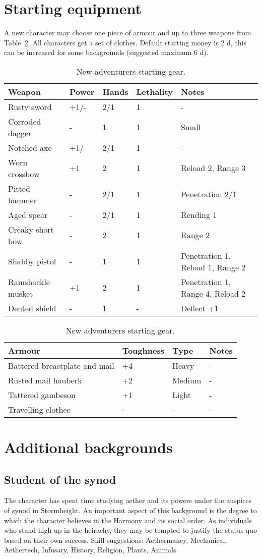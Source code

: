 \documentclass[a4paper,11pt,oneside]{book}
\begin{document}
\section{Starting equipment}
A new character may choose one piece of armour and up to three weapons from Table~\ref{tab:start-gear}. All characters get a set of clothes. Default starting money is 2 d, this can be increased for some backgrounds (suggested maximum 6 d).
\begin{table}[ht!]
	\centering
	\caption{New adventurers starting gear.}
	\label{tab:start-gear}
	\begin{tabular}{|l|l|l|l|l|}
		\hline
		Weapon & Power & Hands & Lethality & Notes\\
		\hline
		Rusty sword & +1/- & 2/1 & 1 & -\\
		Corroded dagger & - & 1 & 1 & Small\\
		Notched axe & +1/- & 2/1 & 1 & -\\
		Worn crossbow & +1 & 2 & 1 & Reload 2, Range 3\\
		Pitted hammer & - & 2/1 & 1 & Penetration 2/1 \\
		Aged spear & - & 2/1 & 1 & Rending 1\\
		Creaky short bow & - & 2 & 1 & Range 2\\
		Shabby pistol & - & 1 & 1 & Penetration 1, Reload 1, Range 2 \\
		Ramshackle musket & +1 & 2 & 1 & Penetration 1, Range 4, Reload 2 \\
		Dented shield & - & 1 & - & Deflect +1 \\
		\hline
	\end{tabular}
	\begin{tabular}{|l|l|l|l|}	
		\hline
		Armour & Toughness & Type & Notes\\
		\hline
		Battered breastplate and mail & +4 & Heavy & - \\
		Rusted mail hauberk & +2 & Medium & - \\
		Tattered gambeson & +1 & Light & - \\
		Travelling clothes & - & - & - \\
		\hline
	\end{tabular}
\end{table}


\section{Additional backgrounds}

\subsection{Student of the synod}
The character has spent time studying aether and its powers under the auspices of synod in Stormheight. An important aspect of this background is the degree to which the character believes in the Harmony and its social order. As individuals who stand high up in the heirachy, they may be tempted to justify the status quo based on their own success. Skill suggestions: Aethermancy, Mechanical, Aethertech, Infusary, History, Religion, Plants, Animals.
\end{document}

